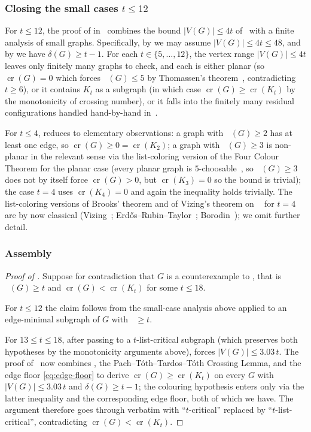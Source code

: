 \documentclass[11pt,a4paper]{article}
\theoremstyle{definition}
\DeclareMathOperator{\crN}{cr}
\DeclareMathOperator{\chl}{\chi_{\ell}}
\begin{document}
\subsubsection*{Closing the small cases $t \le 12$}
\label{ssec:small-cases}

For $t \le 12$, the proof of  in~\cite{ACF}
combines the bound $|V(G)| \le 4t$ of~ with a
finite analysis of small graphs. Specifically, by
 we may assume $|V(G)| \le 4t \le 48$, and by
 we have $\delta(G) \ge t - 1$. For each
$t \in \{5, \dots, 12\}$, the vertex range $|V(G)| \le 4t$ leaves
only finitely many graphs to check, and each is either planar
(so $\crN(G) = 0$ which forces $\chl(G) \le 5$ by Thomassen's
theorem~\cite{Thomassen}, contradicting $t \ge 6$), or it contains
$K_t$ as a subgraph (in which case $\crN(G) \ge \crN(K_t)$ by the
monotonicity of crossing number), or it falls into the finitely
many residual configurations handled hand-by-hand in~\cite{ACF}.

For $t \le 4$,  reduces to elementary
observations: a graph with $\chl(G) \ge 2$ has at least one edge,
so $\crN(G) \ge 0 = \crN(K_2)$; a graph with $\chl(G) \ge 3$ is
non-planar in the relevant sense via the list-coloring version of
the Four Colour Theorem for the planar case (every planar graph is
$5$-choosable~\cite{Thomassen}, so $\chl(G) \ge 3$ does not by
itself force $\crN(G) > 0$, but $\crN(K_3) = 0$ so the bound is
trivial); the case $t = 4$ uses $\crN(K_4) = 0$ and again the
inequality holds trivially. The list-coloring versions of Brooks'
theorem and of Vizing's theorem on $\chl$ for $t = 4$ are by now
classical (Vizing~\cite{Vizing}; Erd\H{o}s--Rubin--Taylor~\cite{ERT};
Borodin~\cite{Borodin1977}); we omit further detail.

\subsubsection*{Assembly}

\begin{proof}[Proof of ]
Suppose for contradiction that $G$ is a counterexample to
, that is $\chl(G) \ge t$ and
$\crN(G) < \crN(K_t)$ for some $t \le 18$.

For $t \le 12$ the claim follows from the small-case analysis
above applied to an edge-minimal subgraph of $G$ with $\chl \ge t$.

For $13 \le t \le 18$, after passing to a $t$-list-critical
subgraph (which preserves both hypotheses by the monotonicity
arguments above),  forces $|V(G)| \le
3.03\,t$. The proof of~\cite[Theorem~1]{Ackerman} now combines
, the Pach--T\'oth--Tardos--T\'oth Crossing
Lemma, and the edge floor \eqref{eq:edge-floor} to derive
$\crN(G) \ge \crN(K_t)$ on every $G$ with $|V(G)| \le 3.03\,t$ and
$\delta(G) \ge t - 1$; the colouring hypothesis enters only via
the latter inequality and the corresponding edge floor, both of
which we have. The argument therefore goes through verbatim with
``$t$-critical'' replaced by ``$t$-list-critical'', contradicting
$\crN(G) < \crN(K_t)$.
\end{proof}
\end{document}
